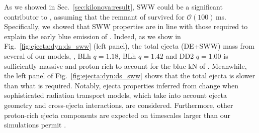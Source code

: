 
%
As we showed in Sec.~\ref{sec:kilonova:result}, \ac{SWW} could be 
a significant contributor to \AT{}, assuming that 
the \pmerg{} remnant of \GW{} survived for $\mathcal{O}(100)\,$ms.
Specifically, we showed that \ac{SWW} properties are in line with 
those required to explain the early blue emission of \AT{}. 
%
Indeed, as we show in Fig.~\ref{fig:ejecta:dyn:ds_sww} (left panel),
%
the total ejecta (\ac{DE}+\ac{SWW}) mass from several of our models, \eg, 
BLh $q=1.18$, BLh $q=1.42$ and DD2 $q=1.00$ 
is sufficiently massive and proton-rich to account for the blue 
\ac{kN} of \AT{}. Meanwhile, the left panel of Fig.~\ref{fig:ejecta:dyn:ds_sww} 
shows that the total ejecta is slower than what is required. 
%
Notably, ejecta properties inferred from \AT{} change when sophisticated 
radiation transport models, which take into account ejecta geometry and cross-ejecta 
interactions, are considered. Furthermore, other proton-rich ejecta components are 
expected on timescales larger than our simulations permit 
\citep[\eg][]{Fujibayashi:2017puw,Fernandez:2018kax,Radice:2018xqa}.

%



